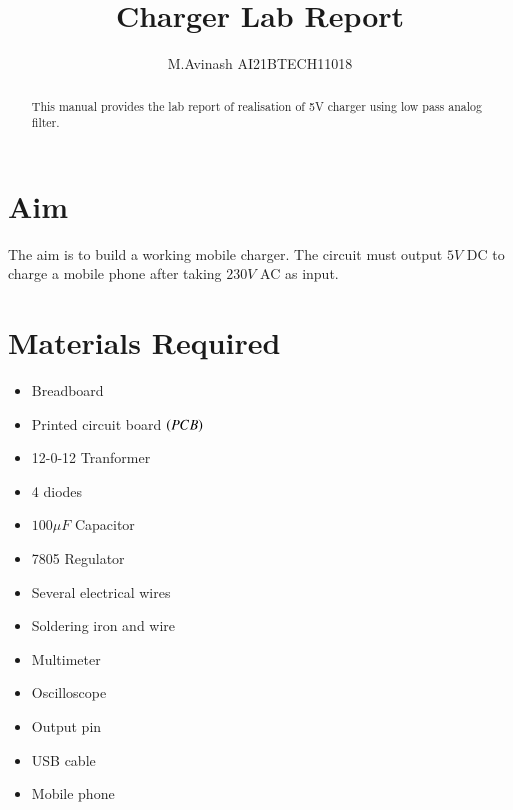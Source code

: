 \documentclass[journal,12pt,twocolumn]{IEEEtran}
\numberwithin{figure}{section}
\begin{document}
\let\StandardTheFigure\thefigure
\renewcommand{\thefigure}{\theproblem}



\def\putbox#1#2#3{\makebox[0in][l]{\makebox[#1][l]{}\raisebox{\baselineskip}[0in][0in]{\raisebox{#2}[0in][0in]{#3}}}}
     \def\rightbox#1{\makebox[0in][r]{#1}}
     \def\centbox#1{\makebox[0in]{#1}}
     \def\topbox#1{\raisebox{-\baselineskip}[0in][0in]{#1}}
     \def\midbox#1{\raisebox{-0.5\baselineskip}[0in][0in]{#1}}

\vspace{3cm}

\title{ 
Charger Lab Report
}



\author{ M.Avinash AI21BTECH11018 %
}
\maketitle


\tableofcontents


\renewcommand{\thefigure}{\theenumi}
\renewcommand{\thetable}{\theenumi}



\bigskip

\begin{abstract}
This manual provides the lab report of realisation of 5V charger using low pass analog filter. 
\end{abstract}
\section{Aim}
	The aim is to build a working mobile charger. The circuit must output $5V$ DC to charge a mobile phone after taking $230V$ AC as input.
	
	\section{Materials Required}
	\begin{itemize}
	\item Breadboard
	\item Printed circuit board $\left(PCB\right)$
	\item 12-0-12 Tranformer
	\item 4 diodes
	\item $100 \mu F$ Capacitor
	\item 7805 Regulator
	\item Several electrical wires
	\item Soldering iron and wire
	\item Multimeter
	\item Oscilloscope
	\item Output pin
	\item USB cable
	\item Mobile phone
	\end{itemize}
\end{document}
